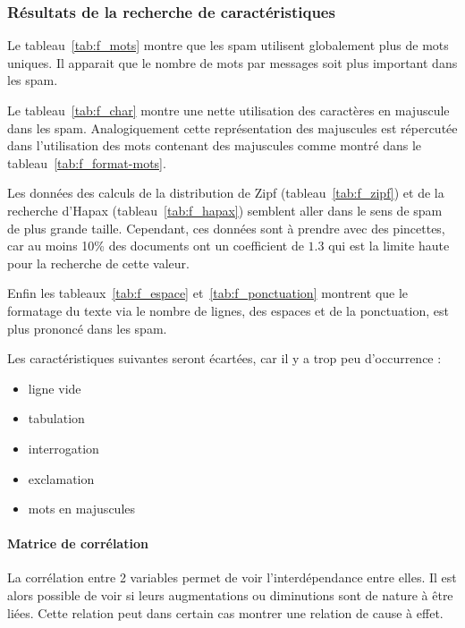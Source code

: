     \subsubsection*{Résultats de la recherche de caractéristiques}
        
        Le tableau~\ref{tab:f_mots} montre que les spam utilisent globalement plus de mots uniques.
        Il apparait que le nombre de mots par messages soit plus important dans les spam.

        
        Le tableau~\ref{tab:f_char} montre une nette utilisation des caractères en majuscule dans les spam.
        Analogiquement cette représentation des majuscules est répercutée dans l'utilisation des mots contenant des majuscules comme montré dans le tableau~\ref{tab:f_format-mots}.
        

        Les données des calculs de la distribution de Zipf (tableau~\ref{tab:f_zipf}) et
        de la recherche d'Hapax (tableau~\ref{tab:f_hapax}) semblent aller dans le sens de spam de plus grande taille.
        Cependant, ces données sont à prendre avec des pincettes, car au moins 10\% des documents ont un coefficient de $1.3$ qui est la limite haute pour la recherche de cette valeur.
        
        

        Enfin les tableaux~\ref{tab:f_espace} et~\ref{tab:f_ponctuation} montrent que le formatage du texte via le nombre de lignes, des espaces et de la ponctuation, est plus prononcé dans les spam.
        
        

        Les caractéristiques suivantes seront écartées, car il y a trop peu d'occurrence :
        \begin{itemize}
            \item ligne vide
            \item tabulation
            \item interrogation
            \item exclamation
            \item mots en majuscules
        \end{itemize}

        \paragraph{Matrice de corrélation}
            La corrélation entre 2 variables permet de voir l'interdépendance entre elles.
            Il est alors possible de voir si leurs augmentations ou diminutions sont de nature à être liées.
            Cette relation peut dans certain cas montrer une relation de cause à effet.

